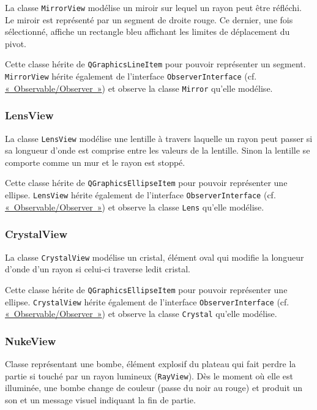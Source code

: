 \documentclass[]{report}
\begin{document}
La classe \texttt{MirrorView} modélise un miroir sur lequel un rayon peut être réfléchi.
Le miroir est représenté par un segment de droite rouge. Ce dernier, une fois sélectionné, affiche
un rectangle bleu affichant les limites de déplacement du pivot. 

Cette classe hérite de \texttt{QGraphicsLineItem} pour pouvoir représenter un segment.
\texttt{MirrorView} hérite également de l'interface \texttt{ObserverInterface} (cf. \hyperref[OO]{«~Observable/Observer~»}) et observe
la classe \texttt{Mirror} qu'elle modélise.

\subsubsection{\label{LensView}LensView}

La classe \texttt{LensView} modélise une lentille à travers laquelle un rayon peut passer si sa longueur d’onde est
comprise entre les valeurs de la lentille. Sinon la lentille se comporte comme un mur et le rayon 
est stoppé. 

Cette classe hérite de \texttt{QGraphicsEllipseItem} pour pouvoir représenter une ellipse.
\texttt{LensView} hérite également de l'interface \texttt{ObserverInterface} (cf. \hyperref[OO]{«~Observable/Observer~»}) et observe
la classe \texttt{Lens} qu'elle modélise.

\subsubsection{\label{CrystalView}CrystalView}

La classe \texttt{CrystalView} modélise un cristal, élément oval qui modifie la longueur d’onde d’un rayon si
celui-ci traverse ledit cristal.

Cette classe hérite de \texttt{QGraphicsEllipseItem} pour pouvoir représenter une ellipse.
\texttt{CrystalView} hérite également de l'interface \texttt{ObserverInterface} (cf. \hyperref[OO]{«~Observable/Observer~»}) et observe
la classe \texttt{Crystal} qu'elle modélise.

\subsubsection{\label{NukeView}NukeView}

Classe représentant une bombe, élément explosif du plateau qui fait perdre la partie
si touché par un rayon lumineux (\texttt{RayView}). Dès le moment où elle est illuminée, une bombe
change de couleur (passe du noir au rouge) et produit un son et un message visuel indiquant la fin de partie.
\end{document}
